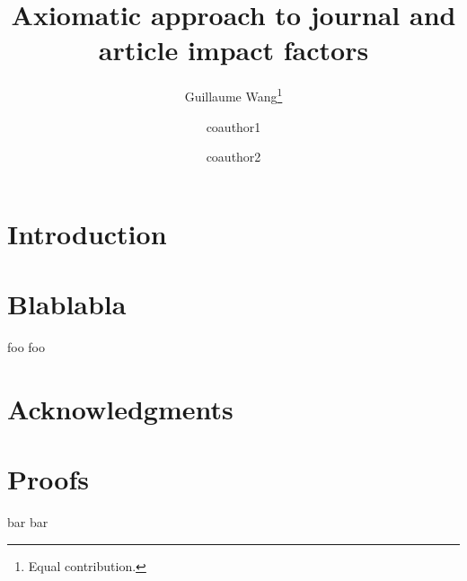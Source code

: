 \documentclass{article}
\title{Axiomatic approach to journal and article impact factors}
\date{}
\author[1]{Guillaume Wang\footnote{Equal contribution.}}
\author[1,2]{coauthor1\protect\CoAuthorMark}
\author[1]{coauthor2}
\affil[1]{affil1}
\affil[2]{affil2}
\begin{document}
\maketitle

%
%
%
%

\section{Introduction}
\cite{kolmogorov_entropy_1959}

\section{Blablabla}
foo foo



\section*{Acknowledgments}


\printbibliography
{} %

\newpage
\appendix

%

\section{Proofs}
bar bar
\end{document}
